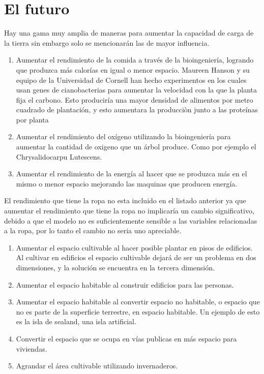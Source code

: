 \documentclass[12pt]{report}
\begin{document}
\section*{El futuro}
Hay una gama muy amplia de maneras para aumentar la capacidad de carga de la tierra sin embargo solo se mencionar\'an las de mayor influencia.

\begin{enumerate}
    \item Aumentar el rendimiento de la comida a trav\'es de la bioingenier\'ia, logrando que produzca m\'as calor\'ias en igual o menor espacio. Maureen Hanson y su equipo de la Universidad de Cornell han hecho experimentos en los cuales usan genes de cianobacterias para aumentar la velocidad con la que la planta fija el carbono. Esto producir\'ia una mayor densidad de alimentos por metro cuadrado de plantaci\'on, y esto aumentara la producci\`on junto a las prote\'inas por planta
    \item Aumentar el rendimiento del ox\'igeno utilizando la bioingenier\'ia para aumentar la cantidad de oxigeno que un \'arbol produce. Como por ejemplo el Chrysalidocarpu Lutescens. 
    \item Aumentar el rendimiento de la energ\'ia al hacer que se produzca m\'as en el mismo o menor espacio mejorando las maquinas que producen energ\'ia. 
\end{enumerate}
El rendimiento que tiene la ropa no esta incluido en el listado anterior ya que aumentar el rendimiento que tiene la ropa no implicar\'ia un cambio significativo, debido a que el modelo no es suficientemente sensible a las variables relacionadas a la ropa, por lo tanto el cambio no seria uno apreciable.
\begin{enumerate}[resume]
    \item Aumentar el espacio cultivable al hacer posible plantar en pisos de edificios. Al cultivar en edificios el espacio cultivable dejar\'a de ser un problema en dos dimensiones, y la soluci\'on se encuentra en la tercera dimensi\'on.
    \item Aumentar el espacio habitable al construir edificios para las personas.
    \item Aumentar el espacio habitable al convertir espacio no habitable, o espacio que no es parte de la superficie terrestre, en espacio habitable. Un ejemplo de esto es la isla de sealand, una isla artificial.
    \item Convertir el espacio que se ocupa en v\'ias publicas en m\'as espacio para viviendas.
    \item Agrandar el \'area cultivable utilizando invernaderos.
\end{enumerate}
\end{document}
